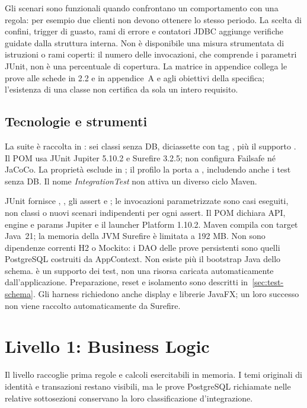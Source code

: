 Gli scenari sono funzionali quando confrontano un comportamento con una
regola: per esempio due clienti non devono ottenere lo stesso periodo.
La scelta di confini, trigger di guasto, rami di errore e contatori JDBC
aggiunge verifiche guidate dalla struttura interna. Non è disponibile una
misura strumentata di istruzioni o rami coperti: il numero delle invocazioni,
che comprende i parametri JUnit, non è una percentuale di copertura.
La matrice in appendice collega le prove alle schede in 2.2 e in appendice~A e agli
obiettivi della specifica; l'esistenza di una classe non certifica da sola
un intero requisito.

\subsection{Tecnologie e strumenti}\label{sec:test-strumenti}
La suite è raccolta in : sei classi
senza DB, diciassette con tag , più il supporto
. Il POM usa JUnit Jupiter 5.10.2 e Surefire 3.2.5;
non configura Failsafe né JaCoCo. La proprietà 
esclude  in ; il profilo
 la porta a , includendo anche i test
senza DB. Il nome \emph{IntegrationTest} non attiva un diverso ciclo Maven.

JUnit fornisce , , gli assert e
; le invocazioni parametrizzate sono casi eseguiti,
non classi o nuovi scenari indipendenti per ogni assert. Il POM dichiara
API, engine e params Jupiter e il launcher Platform 1.10.2. Maven compila
con target Java~21; la memoria della JVM Surefire è limitata a 192 MB.
Non sono dipendenze correnti H2 o Mockito: i DAO delle prove persistenti
sono quelli PostgreSQL costruiti da AppContext. Non esiste più il
bootstrap Java dello schema.  è un supporto dei test,
non una risorsa caricata automaticamente dall'applicazione. Preparazione,
reset e isolamento sono descritti in~\ref{sec:test-schema}.
Gli harness richiedono anche display e librerie JavaFX; un loro successo
non viene raccolto automaticamente da Surefire.

\section{Livello 1: Business Logic}\label{sec:test-business}
Il livello raccoglie prima regole e calcoli esercitabili in memoria.
I temi originali di identità e transazioni restano visibili, ma le prove
PostgreSQL richiamate nelle relative sottosezioni conservano la loro
classificazione d'integrazione.

